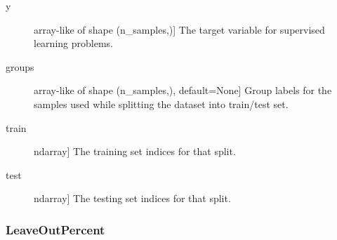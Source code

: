 \documentclass[letterpaper,10pt,english]{sphinxmanual}
\begin{document}
\begin{fulllineitems}
\begin{fulllineitems}
\begin{description}
\item[{y}] \leavevmode{[}array-like of shape (n\_samples,){]}
The target variable for supervised learning problems.

\item[{groups}] \leavevmode{[}array-like of shape (n\_samples,), default=None{]}
Group labels for the samples used while splitting the dataset into
train/test set.

\end{description}
\begin{description}
\item[{train}] \leavevmode{[}ndarray{]}
The training set indices for that split.

\item[{test}] \leavevmode{[}ndarray{]}
The testing set indices for that split.

\end{description}

\end{fulllineitems}


\end{fulllineitems}



\subsubsection{LeaveOutPercent}
\label{\detokenize{api/mastml.data_splitters.LeaveOutPercent:leaveoutpercent}}\label{\detokenize{api/mastml.data_splitters.LeaveOutPercent::doc}}
\end{document}
